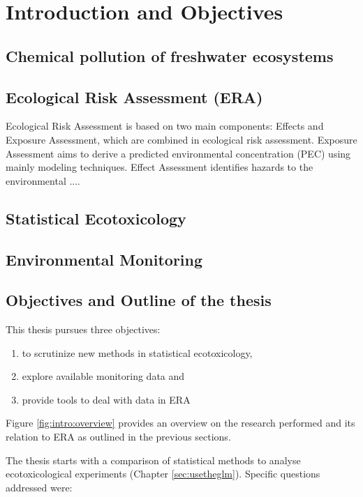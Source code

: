 \chapter{Introduction and Objectives}
\label{sec:introduction} 

\section{Chemical pollution of freshwater ecosystems}

\section{Ecological Risk Assessment (ERA)}
Ecological Risk Assessment is based on two main components: Effects and Exposure Assessment, which are combined in ecological risk assessment.
Exposure Assessment aims to derive a predicted environmental concentration (PEC) using mainly modeling techniques.
Effect Assessment identifies hazards to the environmental ....

\section{Statistical Ecotoxicology}



\section{Environmental Monitoring}





\section{Objectives and Outline of the thesis}
This thesis pursues three objectives: 
\begin{enumerate}[i]
	\item to scrutinize new methods in statistical ecotoxicology,
	\item explore available monitoring data and
	\item provide tools to deal with data in ERA
\end{enumerate}
Figure \ref{fig:intro:overview} provides an overview on the research performed and its relation to ERA as outlined in the previous sections.

\noindent
The thesis starts with a comparison of statistical methods to analyse ecotoxicological experiments (Chapter \ref{sec:usetheglm}). 
Specific questions addressed were:

